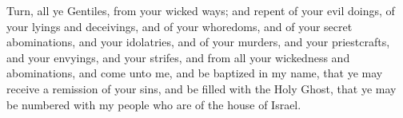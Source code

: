 \bverse \iffalse Turn, all ye Gentiles, from your wicked ways; and repent of your evil doings, of your lyings and deceivings, and of your whoredoms, and of your secret abominations, and your idolatries, and of your murders, and your priestcrafts, and your envyings, and your strifes, and from all your wickedness and abominations, and come unto me, and be baptized in my name, that ye may receive a remission of your sins, and be filled with the Holy Ghost, that ye may be numbered with my people who are of the house of Israel. \fi
Turn, all ye Gentiles, from your wicked ways; and repent of your evil doings, of your lyings and deceivings, and of your whoredoms, and of your secret abominations, and your idolatries, and of your murders, and your priestcrafts, and your envyings, and your strifes, and from all your wickedness and abominations, and come unto me, and be baptized in my name, that ye may receive a remission of your sins, and be filled with the Holy Ghost, that ye may be numbered with my people who are of the house of Israel.